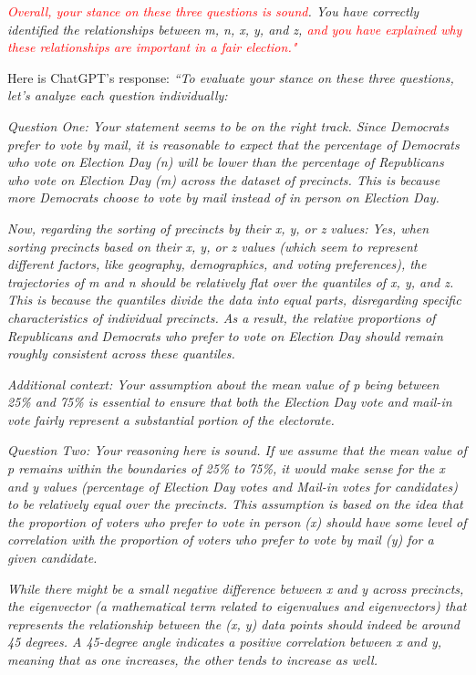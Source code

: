 \documentclass[preprint,13pt]{elsarticle}
\begin{document}
\textit{\textcolor{red}{Overall, your stance on these three questions is sound}. You have correctly identified the relationships between m, n, x, y, and z, \textcolor{red}{and you have explained why these relationships are important in a fair election."}}

Here is ChatGPT's response:
\textit{``To evaluate your stance on these three questions, let's analyze each question individually:}

\textit{Question One:
Your statement seems to be on the right track. Since Democrats prefer to vote by mail, it is reasonable to expect that the percentage of Democrats who vote on Election Day (n) will be lower than the percentage of Republicans who vote on Election Day (m) across the dataset of precincts. This is because more Democrats choose to vote by mail instead of in person on Election Day.}

\textit{Now, regarding the sorting of precincts by their x, y, or z values: Yes, when sorting precincts based on their x, y, or z values (which seem to represent different factors, like geography, demographics, and voting preferences), the trajectories of m and n should be relatively flat over the quantiles of x, y, and z. This is because the quantiles divide the data into equal parts, disregarding specific characteristics of individual precincts. As a result, the relative proportions of Republicans and Democrats who prefer to vote on Election Day should remain roughly consistent across these quantiles.}

\textit{Additional context: Your assumption about the mean value of p being between 25\% and 75\% is essential to ensure that both the Election Day vote and mail-in vote fairly represent a substantial portion of the electorate.}

\textit{Question Two:
Your reasoning here is sound. If we assume that the mean value of p remains within the boundaries of 25\% to 75\%, it would make sense for the x and y values (percentage of Election Day votes and Mail-in votes for candidates) to be relatively equal over the precincts. This assumption is based on the idea that the proportion of voters who prefer to vote in person (x) should have some level of correlation with the proportion of voters who prefer to vote by mail (y) for a given candidate.}

\textit{While there might be a small negative difference between x and y across precincts, the eigenvector (a mathematical term related to eigenvalues and eigenvectors) that represents the relationship between the (x, y) data points should indeed be around 45 degrees. A 45-degree angle indicates a positive correlation between x and y, meaning that as one increases, the other tends to increase as well.}
\end{document}
